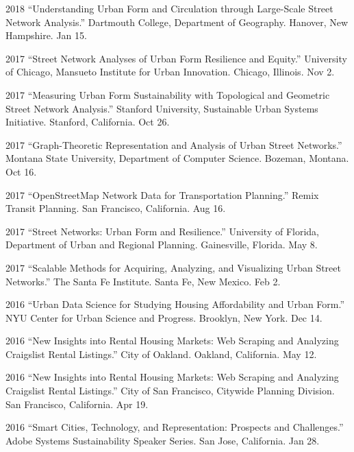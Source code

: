\documentclass[12pt,letterpaper]{report}
\begin{document}
\begin{tablist}
		\item[2018] \tab \enquote{Understanding Urban Form and Circulation through Large-Scale Street Network Analysis.} Dartmouth College, Department of Geography. Hanover, New Hampshire. Jan 15.
		
		\item[2017] \tab \enquote{Street Network Analyses of Urban Form Resilience and Equity.} University of Chicago, Mansueto Institute for Urban Innovation. Chicago, Illinois. Nov 2.
		
		\item[2017] \tab \enquote{Measuring Urban Form Sustainability with Topological and Geometric Street Network Analysis.} Stanford University, Sustainable Urban Systems Initiative. Stanford, California. Oct 26.
		
		\item[2017] \tab \enquote{Graph-Theoretic Representation and Analysis of Urban Street Networks.} Montana State University, Department of Computer Science. Bozeman, Montana. Oct 16.
		
		\item[2017] \tab \enquote{OpenStreetMap Network Data for Transportation Planning.} Remix Transit Planning. San Francisco, California. Aug 16.
		
		\item[2017] \tab \enquote{Street Networks: Urban Form and Resilience.} University of Florida, Department of Urban and Regional Planning. Gainesville, Florida. May 8.
		
		\item[2017] \tab \enquote{Scalable Methods for Acquiring, Analyzing, and Visualizing Urban Street Networks.} The Santa Fe Institute. Santa Fe, New Mexico. Feb 2.
		
		\item[2016] \tab \enquote{Urban Data Science for Studying Housing Affordability and Urban Form.} NYU Center for Urban Science and Progress. Brooklyn, New York. Dec 14.
		
		\item[2016] \tab \enquote{New Insights into Rental Housing Markets: Web Scraping and Analyzing Craigslist Rental Listings.} City of Oakland. Oakland, California. May 12.
		
		\item[2016] \tab \enquote{New Insights into Rental Housing Markets: Web Scraping and Analyzing Craigslist Rental Listings.} City of San Francisco, Citywide Planning Division. San Francisco, California. Apr 19.
		
		\item[2016] \tab \enquote{Smart Cities, Technology, and Representation: Prospects and Challenges.} Adobe Systems Sustainability Speaker Series. San Jose, California. Jan 28.
		
	\end{tablist}
	
\end{document}
